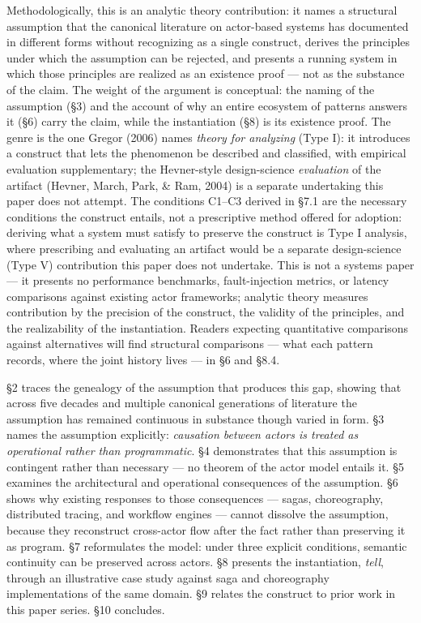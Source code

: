 \documentclass[
]{article}
\begin{document}
Methodologically, this is an analytic theory contribution: it names a
structural assumption that the canonical literature on actor-based
systems has documented in different forms without recognizing as a
single construct, derives the principles under which the assumption can
be rejected, and presents a running system in which those principles are
realized as an existence proof --- not as the substance of the claim.
The weight of the argument is conceptual: the naming of the assumption
(§3) and the account of why an entire ecosystem of patterns answers it
(§6) carry the claim, while the instantiation (§8) is its existence
proof. The genre is the one Gregor (2006) names \emph{theory for
analyzing} (Type I): it introduces a construct that lets the phenomenon
be described and classified, with empirical evaluation supplementary;
the Hevner-style design-science \emph{evaluation} of the artifact
(Hevner, March, Park, \& Ram, 2004) is a separate undertaking this paper
does not attempt. The conditions C1--C3 derived in §7.1 are the
necessary conditions the construct entails, not a prescriptive method
offered for adoption: deriving what a system must satisfy to preserve
the construct is Type I analysis, where prescribing and evaluating an
artifact would be a separate design-science (Type V) contribution this
paper does not undertake. This is not a systems paper --- it presents no
performance benchmarks, fault-injection metrics, or latency comparisons
against existing actor frameworks; analytic theory measures contribution
by the precision of the construct, the validity of the principles, and
the realizability of the instantiation. Readers expecting quantitative
comparisons against alternatives will find structural comparisons ---
what each pattern records, where the joint history lives --- in §6 and
§8.4.

§2 traces the genealogy of the assumption that produces this gap,
showing that across five decades and multiple canonical generations of
literature the assumption has remained continuous in substance though
varied in form. §3 names the assumption explicitly: \emph{causation
between actors is treated as operational rather than programmatic}. §4
demonstrates that this assumption is contingent rather than necessary
--- no theorem of the actor model entails it. §5 examines the
architectural and operational consequences of the assumption. §6 shows
why existing responses to those consequences --- sagas, choreography,
distributed tracing, and workflow engines --- cannot dissolve the
assumption, because they reconstruct cross-actor flow after the fact
rather than preserving it as program. §7 reformulates the model: under
three explicit conditions, semantic continuity can be preserved across
actors. §8 presents the instantiation, \emph{tell}, through an
illustrative case study against saga and choreography implementations of
the same domain. §9 relates the construct to prior work in this paper
series. §10 concludes.
\end{document}
